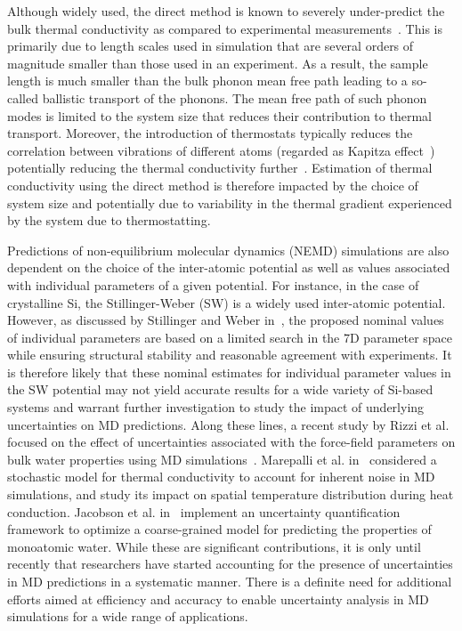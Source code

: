 Although widely used, the direct method is known to severely under-predict
the bulk thermal conductivity as compared to experimental 
measurements~\cite{Haynes:2014,Shanks:1963}. This is primarily
due to length scales used in simulation that are several orders of magnitude smaller
than those used in an experiment. As a result, the sample length is much smaller than the
bulk phonon mean free path leading to a so-called ballistic transport of the phonons.
The mean free path of such phonon modes is limited to the system size that reduces their
contribution to thermal transport. Moreover, the
introduction of thermostats typically reduces the correlation between vibrations of 
different atoms (regarded as Kapitza effect~\cite{Stevens:2007}) potentially reducing
the thermal conductivity
further~\cite{Evans:2008}. Estimation of thermal conductivity using the
direct method is therefore impacted by the choice of system size and potentially due to
variability in the thermal gradient experienced by the system due to thermostatting.  

Predictions of non-equilibrium molecular dynamics (NEMD) simulations are also dependent on the
choice of the inter-atomic potential as well as values associated with individual parameters
of a given potential. For instance, in the case of crystalline Si, the Stillinger-Weber (SW)
is a widely used inter-atomic potential. However, as discussed by Stillinger and Weber
in~\cite{Stillinger:1985}, the proposed nominal values of individual parameters are based
on a limited search in the 7D parameter space while ensuring structural stability and
reasonable agreement with experiments. It is therefore likely that these nominal estimates
for individual parameter values in the SW potential may not yield accurate results for a
wide variety of Si-based systems and warrant further investigation to study the impact of
underlying uncertainties on MD predictions. Along these lines, 
a recent study by Rizzi et al. focused on the effect of
uncertainties associated with the force-field parameters on bulk water properties using MD
simulations~\cite{Rizzi:2012}. Marepalli et al. in~\cite{Marepalli:2014} considered a stochastic model
for thermal conductivity to account for inherent noise in MD simulations, and study its impact on
spatial temperature 
distribution during heat conduction. Jacobson et al. in~\cite{Jacobson:2014} implement an uncertainty
quantification framework to optimize a coarse-grained model for predicting the properties of monoatomic
 water. While these are significant contributions, it is only until recently 
that researchers have started accounting for the presence of uncertainties in MD predictions in a
systematic manner. There is a definite need for additional efforts aimed at efficiency and accuracy
to enable uncertainty analysis in MD simulations for a wide range of applications.

